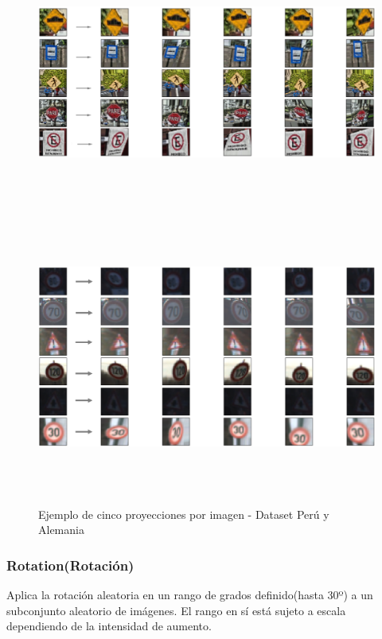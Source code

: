 			\begin{figure}[H]
				\begin{center}
				\includegraphics[width=1\textwidth,height=9cm]{images/desarrollo/Augment/projection_transform3}
				\includegraphics[width=1\textwidth,height=9cm]{images/desarrollo/Augment/projection_transform}
				\end{center}
				\begin{center}
				\vspace{1em}
				\caption{\small{Ejemplo de cinco proyecciones por imagen - Dataset Perú y Alemania}}	
				{\small{\fontsize{10}{16.8}\selectfont {Fuente: Elaboración propia}}}
				\end{center}
				\vspace{-1.5em}
			\end{figure}
		\newpage
		\subsubsection{Rotation(Rotación)}
			Aplica la rotación aleatoria en un rango de grados definido(hasta 30º) a un subconjunto aleatorio de imágenes.
	        El rango en sí está sujeto a escala dependiendo de la intensidad de aumento.

